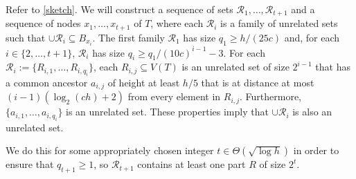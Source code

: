 \documentclass{patmorin}
\DeclareMathOperator{\diam}{diam}
\renewcommand{\ge}{\geqslant}
\begin{document}
Refer to \cref{sketch}.  We will construct a sequence of sets $\mathcal{R}_1,\ldots,\mathcal{R}_{t+1}$ and a sequence of nodes $x_1,\ldots,x_{t+1}$ of $T$, where each $\mathcal{R}_i$ is a family of unrelated sets such that $\cup\mathcal{R}_i\subseteq B_{x_i}$. The first family $\mathcal{R}_1$ has size $q_1\ge h/(25c)$ and, for each $i\in\{2,\ldots,t+1\}$, $\mathcal{R}_i$ has size $q_i\ge q_1/(10c)^{i-1}-3$. For each $\mathcal{R}_i:=\{R_{i,1},\ldots,R_{i,q_i}\}$, each $R_{i,j}\subseteq V(T)$ is an unrelated set of size $2^{i-1}$ that has a common ancestor $a_{i,j}$ of height at least $h/5$ that is at distance at most $(i-1)(\log_2(ch)+2)$ from every element in $R_{i,j}$. Furthermore, $\{a_{i,1},\ldots,a_{i,q_{i}}\}$ is an unrelated set. These properties imply that $\cup\mathcal{R}_i$ is also an unrelated set.

We do this for some appropriately chosen integer $t\in\Theta(\sqrt{\log h})$ in order to ensure that $q_{t+1}\ge 1$, so $\mathcal{R}_{t+1}$ contains at least one part $R$ of size $2^t$.
%
%
%
%
\end{document}
